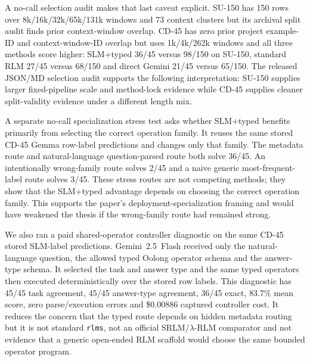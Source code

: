 \documentclass[letterpaper]{article}
\begin{document}
A no-call selection audit makes that last caveat explicit. SU-150 has 150 rows over 8k/16k/32k/65k/131k windows and 73 context clusters but its archival split audit finds prior context-window overlap. CD-45 has zero prior project example-ID and context-window-ID overlap but uses 1k/4k/262k windows and all three methods score higher: SLM+typed 36/45 versus 98/150 on SU-150, standard RLM 27/45 versus 68/150 and direct Gemini 21/45 versus 65/150. The released JSON/MD selection audit supports the following interpretation: SU-150 supplies larger fixed-pipeline scale and method-lock evidence while CD-45 supplies cleaner split-validity evidence under a different length mix.

A separate no-call specialization stress test asks whether SLM+typed benefits primarily from selecting the correct operation family. It reuses the same stored CD-45 Gemma row-label predictions and changes only that family. The metadata route and natural-language question-parsed route both solve 36/45. An intentionally wrong-family route solves 2/45 and a naive generic most-frequent-label route solves 3/45. These stress routes are not competing methods; they show that the SLM+typed advantage depends on choosing the correct operation family. This supports the paper's deployment-specialization framing and would have weakened the thesis if the wrong-family route had remained strong.

We also ran a paid shared-operator controller diagnostic on the same CD-45 stored SLM-label predictions. Gemini~2.5~Flash received only the natural-language question, the allowed typed Oolong operator schema and the answer-type schema. It selected the task and answer type and the same typed operators then executed deterministically over the stored row labels. This diagnostic has 45/45 task agreement, 45/45 answer-type agreement, 36/45 exact, 83.7\% mean score, zero parse/execution errors and \$0.00886 captured controller cost. It reduces the concern that the typed route depends on hidden metadata routing but it is not standard \texttt{rlms}, not an official SRLM/$\lambda$-RLM comparator and not evidence that a generic open-ended RLM scaffold would choose the same bounded operator program.
\end{document}
